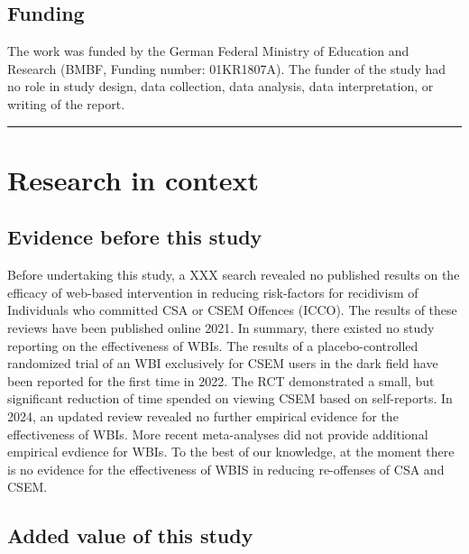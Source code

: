 \documentclass[
  super,
  preprint,
  1p,
  onecolumn]{elsarticle}
\begin{document}
\subsection*{Funding}\label{funding}

The work was funded by the German Federal Ministry of Education and
Research (BMBF, Funding number: 01KR1807A). The funder of the study had
no role in study design, data collection, data analysis, data
interpretation, or writing of the report.

\begin{center}\rule{0.5\linewidth}{0.5pt}\end{center}

\newpage{}

\section*{Research in context}\label{research-in-context}

\subsection*{Evidence before this
study}\label{evidence-before-this-study}

Before undertaking this study, a XXX search revealed no published
results on the efficacy of web-based intervention in reducing
risk-factors for recidivism of Individuals who committed CSA or CSEM
Offences (ICCO). The results of these reviews have been published online
2021. In summary, there existed no study reporting on the effectiveness
of WBIs. The results of a placebo-controlled randomized trial of an WBI
exclusively for CSEM users in the dark field have been reported for the
first time in 2022. The RCT demonstrated a small, but significant
reduction of time spended on viewing CSEM based on self-reports. In
2024, an updated review revealed no further empirical evidence for the
effectiveness of WBIs. More recent meta-analyses did not provide
additional empirical evdience for WBIs. To the best of our knowledge, at
the moment there is no evidence for the effectiveness of WBIS in
reducing re-offenses of CSA and CSEM.

\subsection*{Added value of this study}\label{added-value-of-this-study}
\end{document}
